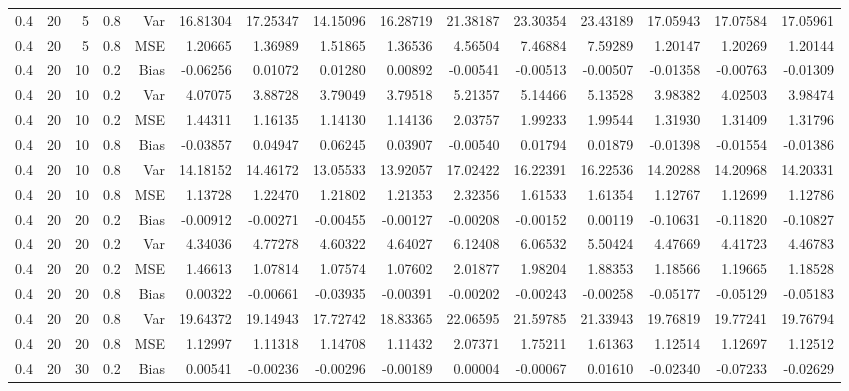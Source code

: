 \begin{table}[!htbp]
\begin{tabular}{lrrrrrrrrrrrrrr}
0.4 &  20 &  5 & 0.8 & Var & 16.81304 & 17.25347 & 14.15096 & 16.28719 & 21.38187 & 23.30354 & 23.43189 & 17.05943 & 17.07584 & 17.05961 \\
0.4 &  20 &  5 & 0.8 & MSE & 1.20665 & 1.36989 & 1.51865 & 1.36536 & 4.56504 & 7.46884 & 7.59289 & 1.20147 & 1.20269 & 1.20144 \\
0.4 &  20 & 10 & 0.2 & Bias & -0.06256 & 0.01072 & 0.01280 & 0.00892 & -0.00541 & -0.00513 & -0.00507 & -0.01358 & -0.00763 & -0.01309 \\
0.4 &  20 & 10 & 0.2 & Var & 4.07075 & 3.88728 & 3.79049 & 3.79518 & 5.21357 & 5.14466 & 5.13528 & 3.98382 & 4.02503 & 3.98474 \\
0.4 &  20 & 10 & 0.2 & MSE & 1.44311 & 1.16135 & 1.14130 & 1.14136 & 2.03757 & 1.99233 & 1.99544 & 1.31930 & 1.31409 & 1.31796 \\
0.4 &  20 & 10 & 0.8 & Bias & -0.03857 & 0.04947 & 0.06245 & 0.03907 & -0.00540 & 0.01794 & 0.01879 & -0.01398 & -0.01554 & -0.01386 \\
0.4 &  20 & 10 & 0.8 & Var & 14.18152 & 14.46172 & 13.05533 & 13.92057 & 17.02422 & 16.22391 & 16.22536 & 14.20288 & 14.20968 & 14.20331 \\
0.4 &  20 & 10 & 0.8 & MSE & 1.13728 & 1.22470 & 1.21802 & 1.21353 & 2.32356 & 1.61533 & 1.61354 & 1.12767 & 1.12699 & 1.12786 \\
0.4 &  20 & 20 & 0.2 & Bias & -0.00912 & -0.00271 & -0.00455 & -0.00127 & -0.00208 & -0.00152 & 0.00119 & -0.10631 & -0.11820 & -0.10827 \\
0.4 &  20 & 20 & 0.2 & Var & 4.34036 & 4.77278 & 4.60322 & 4.64027 & 6.12408 & 6.06532 & 5.50424 & 4.47669 & 4.41723 & 4.46783 \\
0.4 &  20 & 20 & 0.2 & MSE & 1.46613 & 1.07814 & 1.07574 & 1.07602 & 2.01877 & 1.98204 & 1.88353 & 1.18566 & 1.19665 & 1.18528 \\
0.4 &  20 & 20 & 0.8 & Bias & 0.00322 & -0.00661 & -0.03935 & -0.00391 & -0.00202 & -0.00243 & -0.00258 & -0.05177 & -0.05129 & -0.05183 \\
0.4 &  20 & 20 & 0.8 & Var & 19.64372 & 19.14943 & 17.72742 & 18.83365 & 22.06595 & 21.59785 & 21.33943 & 19.76819 & 19.77241 & 19.76794 \\
0.4 &  20 & 20 & 0.8 & MSE & 1.12997 & 1.11318 & 1.14708 & 1.11432 & 2.07371 & 1.75211 & 1.61363 & 1.12514 & 1.12697 & 1.12512 \\
0.4 &  20 & 30 & 0.2 & Bias & 0.00541 & -0.00236 & -0.00296 & -0.00189 & 0.00004 & -0.00067 & 0.01610 & -0.02340 & -0.07233 & -0.02629 \\

\end{tabular}
\end{table}
